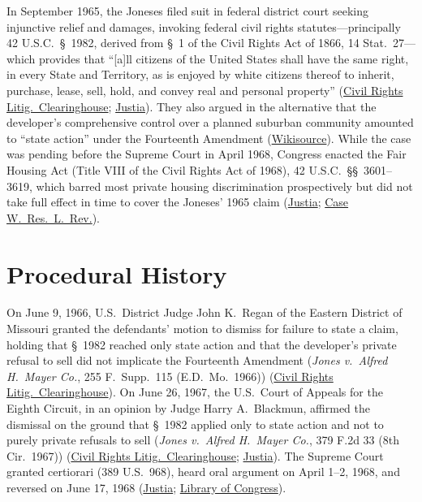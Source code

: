 \documentclass[12pt]{article}
\begin{document}
In September 1965, the Joneses filed suit in federal district court seeking injunctive relief and damages, invoking federal civil rights statutes---principally 42 U.S.C.\ \S~1982, derived from \S~1 of the Civil Rights Act of 1866, 14 Stat.\ 27---which provides that ``[a]ll citizens of the United States shall have the same right, in every State and Territory, as is enjoyed by white citizens thereof to inherit, purchase, lease, sell, hold, and convey real and personal property'' (\href{https://clearinghouse.net/case/10160/}{Civil Rights Litig.\ Clearinghouse}; \href{https://supreme.justia.com/cases/federal/us/392/409/}{Justia}). They also argued in the alternative that the developer's comprehensive control over a planned suburban community amounted to ``state action'' under the Fourteenth Amendment (\href{https://en.wikisource.org/wiki/Jones_v._Mayer/Dissent_Harlan}{Wikisource}). While the case was pending before the Supreme Court in April 1968, Congress enacted the Fair Housing Act (Title VIII of the Civil Rights Act of 1968), 42 U.S.C.\ \S\S~3601--3619, which barred most private housing discrimination prospectively but did not take full effect in time to cover the Joneses' 1965 claim (\href{https://supreme.justia.com/cases/federal/us/392/409/}{Justia}; \href{https://scholarlycommons.law.case.edu/cgi/viewcontent.cgi?params=/context/caselrev/article/2719/&path_info=29_20CaseWResLRev448_1968_1969_.pdf}{Case W.\ Res.\ L.\ Rev.}).

\section{Procedural History}

On June 9, 1966, U.S.\ District Judge John K.\ Regan of the Eastern District of Missouri granted the defendants' motion to dismiss for failure to state a claim, holding that \S~1982 reached only state action and that the developer's private refusal to sell did not implicate the Fourteenth Amendment (\textit{Jones v.\ Alfred H.\ Mayer Co.}, 255 F.\ Supp.\ 115 (E.D.\ Mo.\ 1966)) (\href{https://clearinghouse.net/case/10160/}{Civil Rights Litig.\ Clearinghouse}). On June 26, 1967, the U.S.\ Court of Appeals for the Eighth Circuit, in an opinion by Judge Harry A.\ Blackmun, affirmed the dismissal on the ground that \S~1982 applied only to state action and not to purely private refusals to sell (\textit{Jones v.\ Alfred H.\ Mayer Co.}, 379 F.2d 33 (8th Cir.\ 1967)) (\href{https://clearinghouse.net/case/10160/}{Civil Rights Litig.\ Clearinghouse}; \href{https://supreme.justia.com/cases/federal/us/392/409/}{Justia}). The Supreme Court granted certiorari (389 U.S.\ 968), heard oral argument on April 1--2, 1968, and reversed on June 17, 1968 (\href{https://supreme.justia.com/cases/federal/us/392/409/}{Justia}; \href{https://tile.loc.gov/storage-services/service/ll/usrep/usrep392/usrep392409/usrep392409.pdf}{Library of Congress}).
\end{document}
